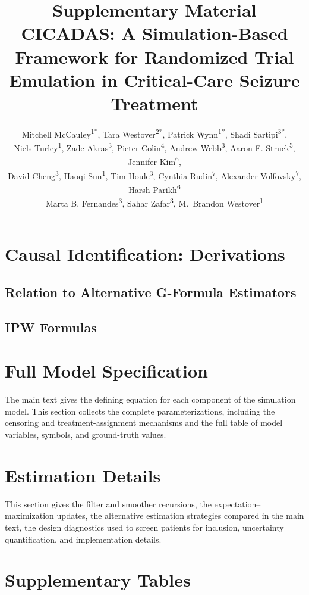 \documentclass{article}
\title{Supplementary Material\\[0.4em]\large CICADAS: A Simulation-Based Framework for Randomized Trial Emulation in Critical-Care Seizure Treatment}
\author{
    Mitchell McCauley\textsuperscript{1*},
    Tara Westover\textsuperscript{2*}, 
    Patrick Wynn\textsuperscript{1*}, 
    Shadi Sartipi\textsuperscript{3*}, \\
    Niels Turley\textsuperscript{1},
    Zade Akras\textsuperscript{3},
    Pieter Colin\textsuperscript{4},
    Andrew Webb\textsuperscript{3}, 
    Aaron F. Struck\textsuperscript{5},
    Jennifer Kim\textsuperscript{6},\\ 
    David Cheng\textsuperscript{3}, %
    Haoqi Sun\textsuperscript{1}, 
    Tim Houle\textsuperscript{3}, 
    Cynthia Rudin\textsuperscript{7}, 
    Alexander Volfovsky\textsuperscript{7}, Harsh Parikh\textsuperscript{6} \\
    Marta B. Fernandes\textsuperscript{3\dag}, %
    Sahar Zafar\textsuperscript{3\dag},
    M.\ Brandon Westover\textsuperscript{1\dag}
}
\date{} %
\begin{document}
\maketitle

\renewcommand{\thesection}{S\arabic{section}}
\renewcommand{\thetable}{S\arabic{table}}
\renewcommand{\thefigure}{S\arabic{figure}}
\setcounter{section}{0}\setcounter{table}{0}\setcounter{figure}{0}

\tableofcontents
\newpage

\section{Causal Identification: Derivations}







\subsection{Relation to Alternative G-Formula Estimators}


\subsection{IPW Formulas}\label{sec:appendix-ipw}







\section{Full Model Specification}
The main text gives the defining equation for each component of the simulation model. This section
collects the complete parameterizations, including the censoring and treatment-assignment mechanisms
and the full table of model variables, symbols, and ground-truth values.



\section{Estimation Details}
This section gives the filter and smoother recursions, the expectation--maximization updates, the
alternative estimation strategies compared in the main text, the design diagnostics used to screen
patients for inclusion, uncertainty quantification, and implementation details.


\section{Supplementary Tables}




\end{document}
